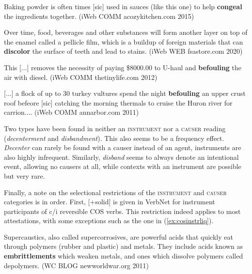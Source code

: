 \begin{exe}
  \ex \label{ex:instrcauscontexts}
  \begin{xlist}
    \item \label{ex:instrcauscont1} Baking powder is often times [sic] used in sauces (like this one) to help \textbf{congeal} the ingredients together. {\small(\acs{iWeb} COMM acozykitchen.com 2015)}
    \item \label{ex:instrcauscont2} Over time, food, beverages and other substances will form another layer on top of the enamel called a pellicle film, which is a buildup of foreign materials that can \textbf{discolor} the surface of teeth and lead to stains.  {\small(\acs{iWeb} WEB fsastore.com 2020)}
    \item \label{ex:instrcauscont3} This [...] removes the necessity of paying \$8000.00 to U-haul and \textbf{befouling} the air with diesel. {\small(\acs{iWeb} COMM thetinylife.com 2012)}
    \item \label{ex:instrcauscont4} [...] a flock of up to 30 turkey vultures spend the night \textbf{befouling} an upper crust roof befeore [sic] catching the morning thermals to cruise the Huron river for carrion.... {\small(\acs{iWeb} COMM annarbor.com 2011)}
  \end{xlist}
\end{exe}

\noindent Two types have been found in neither an \textsc{instrument} nor a \textsc{causer} reading (\textit{decenterment} and \textit{disbandment}). This also seems to be a frequency effect. \textit{Decenter} can rarely be found with a causer instead of an agent, 
instruments are also highly infrequent. 
Similarly, \textit{disband} seems to always denote an intentional event, allowing no causers at all, while contexts with an instrument are possible but very rare.

Finally, a note on the selectional restrictions of the \textsc{instrument} and \textsc{causer} categories is in order.
First, [+solid] is given in VerbNet for instrument participants of c/i reversible COS verbs. This restriction indeed applies to most attestations, with some exceptions such as the one in (\ref{ex:cosinstrliq}).

\begin{exe}
  \ex \label{ex:cosinstrliq}  Supercaustics, also called supercorrosives, are powerful acids that quickly eat through polymers (rubber and plastic) and metals. They include acids known as \textbf{embrittlements} which weaken metals, and ones which dissolve polymers called depolymers. {\small(\acs{WC} BLOG newworldwar.org 2011)}
\end{exe}   

